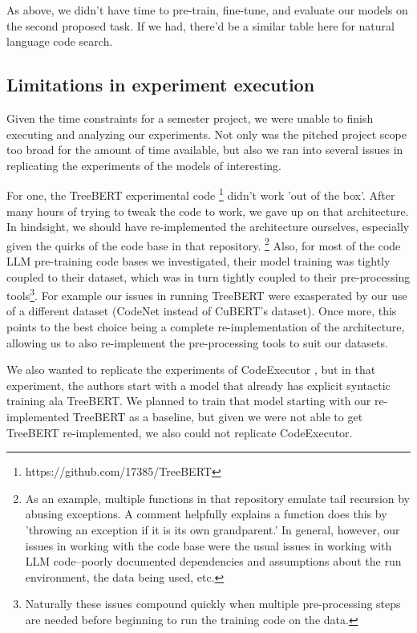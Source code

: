 \documentclass[acmlarge]{acmart}
\begin{document}
As above, we didn't have time to pre-train, fine-tune, and evaluate our models on the second proposed task. If we had, there'd be a similar table here for natural language code search.

\subsection{Limitations in experiment execution}

Given the time constraints for a semester project, we were unable to finish executing and analyzing our experiments. Not only was the pitched project scope too broad for the amount of time available, but also we ran into several issues in replicating the experiments of the models of interesting.

For one, the TreeBERT  experimental code \footnote{https://github.com/17385/TreeBERT} didn't work 'out of the box'. After many hours of trying to tweak the code to work, we gave up on that architecture. In hindsight, we should have re-implemented the architecture ourselves, especially given the quirks of the code base in that repository. \footnote{As an example, multiple functions in that repository emulate tail recursion by abusing exceptions. A comment helpfully explains a function does this by 'throwing an exception if it is its own grandparent.' In general, however, our issues in working with the code base were the usual issues in working with LLM code--poorly documented dependencies and assumptions about the run environment, the data being used, etc.} Also, for most of the code LLM pre-training code bases we investigated, their model training was tightly coupled to their dataset, which was in turn tightly coupled to their pre-processing tools\footnote{Naturally these issues compound quickly when multiple pre-processing steps are needed before beginning to run the training code on the data.}. For example our issues in running TreeBERT were exasperated by our use of a different dataset (CodeNet instead of CuBERT's dataset). Once more, this points to the best choice being a complete re-implementation of the architecture, allowing us to also re-implement the pre-processing tools to suit our datasets.

We also wanted to replicate the experiments of CodeExecutor \cite{CodeExecutor}, but in that experiment, the authors start with a model that already has explicit syntactic training ala TreeBERT. We planned to train that model starting with our re-implemented TreeBERT as a baseline, but given we were not able to get TreeBERT re-implemented, we also could not replicate CodeExecutor.
\end{document}
